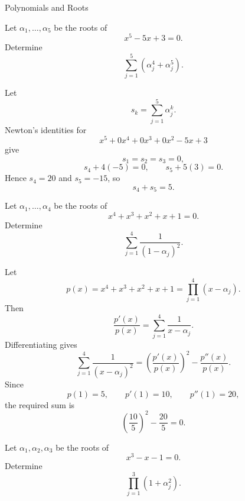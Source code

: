 \begin{expectedproblemgroup}{Polynomials and Roots}
        \begin{expectedsubproblem}
            Let $\alpha_1,\ldots,\alpha_5$ be the roots of
            \[
                x^5-5x+3=0.
            \]
            Determine
            \[
                \sum_{j=1}^{5}
                \left(\alpha_j^4+\alpha_j^5\right).
            \]
        \end{expectedsubproblem}

        \begin{expectedsubsolution}
            Let
            \[
                s_k=\sum_{j=1}^{5}\alpha_j^k.
            \]
            Newton's identities for
            \[
                x^5+0x^4+0x^3+0x^2-5x+3
            \]
            give
            \[
                s_1=s_2=s_3=0,
            \]
            \[
                s_4+4(-5)=0,
                \qquad
                s_5+5(3)=0.
            \]
            Hence $s_4=20$ and $s_5=-15$, so
            \[
                \boxed{s_4+s_5=5}.
            \]
        \end{expectedsubsolution}

        \begin{expectedsubproblem}
            Let $\alpha_1,\ldots,\alpha_4$ be the roots of
            \[
                x^4+x^3+x^2+x+1=0.
            \]
            Determine
            \[
                \sum_{j=1}^{4}\frac{1}{(1-\alpha_j)^2}.
            \]
        \end{expectedsubproblem}

        \begin{expectedsubsolution}
            Let
            \[
                p(x)=x^4+x^3+x^2+x+1
                =
                \prod_{j=1}^{4}(x-\alpha_j).
            \]
            Then
            \[
                \frac{p'(x)}{p(x)}
                =
                \sum_{j=1}^{4}\frac{1}{x-\alpha_j}.
            \]
            Differentiating gives
            \[
                \sum_{j=1}^{4}\frac{1}{(x-\alpha_j)^2}
                =
                \left(\frac{p'(x)}{p(x)}\right)^2
                -
                \frac{p''(x)}{p(x)}.
            \]
            Since
            \[
                p(1)=5,
                \qquad
                p'(1)=10,
                \qquad
                p''(1)=20,
            \]
            the required sum is
            \[
                \boxed{\left(\frac{10}{5}\right)^2-\frac{20}{5}=0}.
            \]
        \end{expectedsubsolution}

        \begin{expectedsubproblem}
            Let $\alpha_1,\alpha_2,\alpha_3$ be the roots of
            \[
                x^3-x-1=0.
            \]
            Determine
            \[
                \prod_{j=1}^{3}(1+\alpha_j^2).
            \]
        \end{expectedsubproblem}


\end{expectedproblemgroup}

